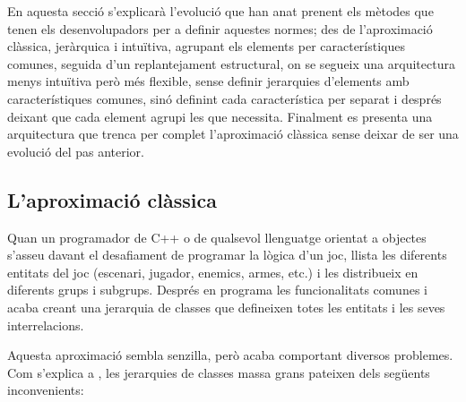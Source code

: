  En aquesta secció s'explicarà l'evolució que han anat prenent els mètodes que tenen els desenvolupadors per a definir aquestes normes; des de l'aproximació clàssica, jeràrquica i intuïtiva, agrupant els elements per característiques comunes, seguida d'un replantejament estructural, on se segueix una arquitectura menys intuïtiva però més flexible, sense definir jerarquies d'elements amb característiques comunes, sinó definint cada característica per separat i després deixant que cada element agrupi les que necessita. Finalment es presenta una arquitectura que trenca per complet l'aproximació clàssica sense deixar de ser una evolució del pas anterior.

\subsection{L'aproximació clàssica}

Quan un programador de {C++} o de qualsevol llenguatge orientat a objectes s'asseu davant el desafiament de programar la lògica d'un joc, llista les diferents entitats del joc (escenari, jugador, enemics, armes, etc.) i les distribueix en diferents grups i subgrups. Després en programa les funcionalitats comunes i acaba creant una jerarquia de classes que defineixen totes les entitats i les seves interrelacions. 

Aquesta aproximació sembla senzilla, però acaba comportant diversos problemes. Com s'explica a \citep[p.~719]{Gregory09}, les jerarquies de classes massa grans pateixen dels següents inconvenients:




